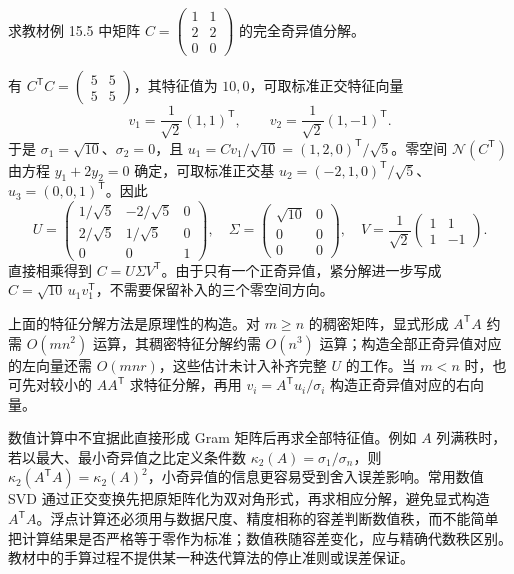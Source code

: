 \begin{example}
\label{ex:lh-svd-rank-one-computation}
求教材例 15.5 中矩阵 $C=\begin{pmatrix}1&1\\2&2\\0&0\end{pmatrix}$ 的完全奇异值分解。
\end{example}
\begin{solve}
有 $C^{\mathsf T}C=\begin{pmatrix}5&5\\5&5\end{pmatrix}$，其特征值为 $10,0$，可取标准正交特征向量
\[
v_1=\frac1{\sqrt2}(1,1)^{\mathsf T},\qquad
v_2=\frac1{\sqrt2}(1,-1)^{\mathsf T}.
\]
于是 $\sigma_1=\sqrt{10}$、$\sigma_2=0$，且 $u_1=Cv_1/\sqrt{10}=(1,2,0)^{\mathsf T}/\sqrt5$。零空间 $\mathcal N(C^{\mathsf T})$ 由方程 $y_1+2y_2=0$ 确定，可取标准正交基 $u_2=(-2,1,0)^{\mathsf T}/\sqrt5$、$u_3=(0,0,1)^{\mathsf T}$。因此
\[
U=\begin{pmatrix}
1/\sqrt5&-2/\sqrt5&0\\
2/\sqrt5&1/\sqrt5&0\\
0&0&1
\end{pmatrix},\quad
\Sigma=\begin{pmatrix}\sqrt{10}&0\\0&0\\0&0\end{pmatrix},\quad
V=\frac1{\sqrt2}\begin{pmatrix}1&1\\1&-1\end{pmatrix}.
\]
直接相乘得到 $C=U\Sigma V^{\mathsf T}$。由于只有一个正奇异值，紧分解进一步写成 $C=\sqrt{10}\,u_1v_1^{\mathsf T}$，不需要保留补入的三个零空间方向。
\end{solve}

上面的特征分解方法是原理性的构造。对 $m\geq n$ 的稠密矩阵，显式形成 $A^{\mathsf T}A$ 约需 $O(mn^2)$ 运算，其稠密特征分解约需 $O(n^3)$ 运算；构造全部正奇异值对应的左向量还需 $O(mnr)$，这些估计未计入补齐完整 $U$ 的工作。当 $m<n$ 时，也可先对较小的 $AA^{\mathsf T}$ 求特征分解，再用 $v_i=A^{\mathsf T}u_i/\sigma_i$ 构造正奇异值对应的右向量。

数值计算中不宜据此直接形成 Gram 矩阵后再求全部特征值。例如 $A$ 列满秩时，若以最大、最小奇异值之比定义条件数 $\kappa_2(A)=\sigma_1/\sigma_n$，则 $\kappa_2(A^{\mathsf T}A)=\kappa_2(A)^2$，小奇异值的信息更容易受到舍入误差影响。常用数值 SVD 通过正交变换先把原矩阵化为双对角形式，再求相应分解，避免显式构造 $A^{\mathsf T}A$。浮点计算还必须用与数据尺度、精度相称的容差判断数值秩，而不能简单把计算结果是否严格等于零作为标准；数值秩随容差变化，应与精确代数秩区别。教材中的手算过程不提供某一种迭代算法的停止准则或误差保证。

